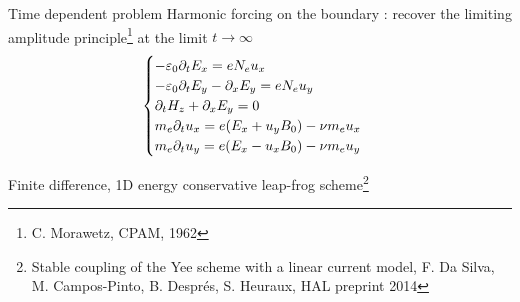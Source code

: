 \begin{frame}{Time dependent problem}
Harmonic forcing on the boundary : recover the limiting amplitude principle\footnote{C. Morawetz, CPAM, 1962} at the limit $t\rightarrow \infty$ 
\[
\begin{cases}
- \varepsilon_0 \partial_t E_x = e N_e u_x \\
- \varepsilon_0 \partial_t E_y - \partial_x E_y =  e N_e u_y \\
\partial_t H_z + \partial_x E_y = 0 \\
m_e \partial_t u_x = e (E_x + u_y B_0) - \nu m_e u_x \\
m_e \partial_t u_y = e (E_x - u_x B_0) - \nu m_e u_y
\end{cases}
\]

\alert{Finite difference, 1D energy conservative leap-frog scheme\footnote{ Stable coupling of the Yee scheme with a linear current model, F. Da Silva, M. Campos-Pinto, B. Després, S. Heuraux, HAL preprint 2014}}

 \begin{center} \href{run:test.mp4}{\Alert{$\diamondsuit$}} \end{center}


\end{frame}
 {
\begin{frame}
\begin{center}
\textcolor{lightred}{}
\end{center}
\end{frame}}

